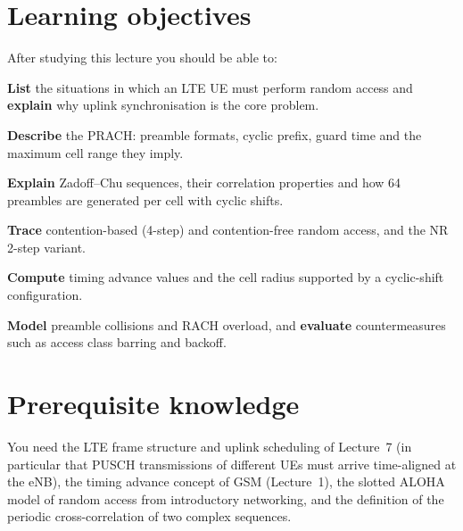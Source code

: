 \documentclass[11pt,a4paper]{article}
\begin{document}
\ACNcover

\section{Learning objectives}
After studying this lecture you should be able to:
\begin{objectives}
  \item \textbf{List} the situations in which an LTE UE must perform random access and
        \textbf{explain} why uplink synchronisation is the core problem.
  \item \textbf{Describe} the PRACH: preamble formats, cyclic prefix, guard time and the
        maximum cell range they imply.
  \item \textbf{Explain} Zadoff--Chu sequences, their correlation properties and how 64
        preambles are generated per cell with cyclic shifts.
  \item \textbf{Trace} contention-based (4-step) and contention-free random access, and the NR
        2-step variant.
  \item \textbf{Compute} timing advance values and the cell radius supported by a cyclic-shift
        configuration.
  \item \textbf{Model} preamble collisions and RACH overload, and \textbf{evaluate} countermeasures
        such as access class barring and backoff.
\end{objectives}

\section{Prerequisite knowledge}
You need the LTE frame structure and uplink scheduling of Lecture~7 (in particular that PUSCH
transmissions of different UEs must arrive time-aligned at the eNB), the timing advance concept
of GSM (Lecture~1), the slotted ALOHA model of random access from introductory networking, and
the definition of the periodic cross-correlation of two complex sequences.
\end{document}
